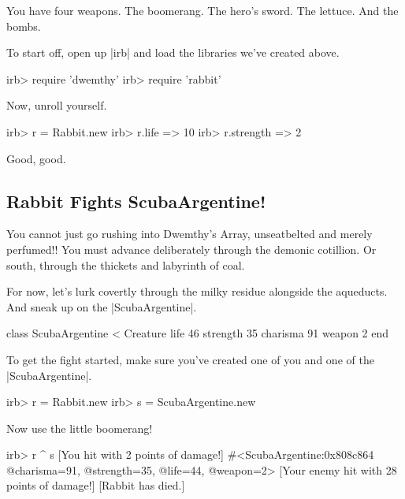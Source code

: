 \documentclass[12pt,twoside]{report}
\begin{document}
You have four weapons.  The boomerang.  The hero's sword.  The
lettuce.  And the bombs.

To start off, open up \rubyinline|irb| and load the
libraries we've created above.


\begin{consolecode}

 irb> require 'dwemthy'
 irb> require 'rabbit'

\end{consolecode}


Now, unroll yourself.


\begin{consolecode}

 irb> r = Rabbit.new
 irb> r.life
   => 10
 irb> r.strength
   => 2

\end{consolecode}


Good, good.



\subsection{Rabbit Fights ScubaArgentine!}



You cannot just go rushing into Dwemthy's Array, unseatbelted and
merely perfumed!!  You must advance deliberately through the demonic
cotillion.  Or south, through the thickets and labyrinth of coal.

For now, let's lurk covertly through the milky residue alongside the
aqueducts.  And sneak up on the
\rubyinline|ScubaArgentine|.


\begin{rubycode}

 class ScubaArgentine < Creature
   life 46
   strength 35
   charisma 91
   weapon 2
 end

\end{rubycode}


To get the fight started, make sure you've created one of you and one
of the \rubyinline|ScubaArgentine|.


\begin{consolecode}

 irb> r = Rabbit.new
 irb> s = ScubaArgentine.new

\end{consolecode}


Now use the little boomerang!


\begin{consolecode}

 irb> r ^ s
 [You hit with 2 points of damage!]
 #<ScubaArgentine:0x808c864 @charisma=91, @strength=35, @life=44, @weapon=2>
 [Your enemy hit with 28 points of damage!]
 [Rabbit has died.]

\end{consolecode}
\end{document}
